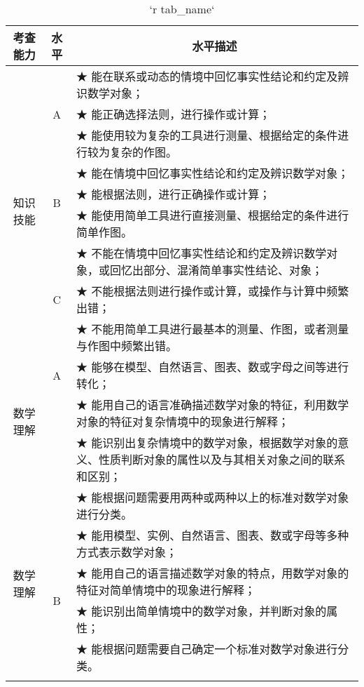 \begin{itshape}
\small
\begin{longtable}{|c|c|p{12cm}|}
\caption{`r tab_name`} \label{tab: `r tab_name`} \\
 
\hline
 \multicolumn{1}{|c}{\normalsize 考查能力} &  \multicolumn{1}{|c|}{\normalsize 水平} &  \multicolumn{1}{c|}{\normalsize 水平描述} \\ 
\hline
   
   \multirow{9}{*}{知识技能}  & \multirow{3}{*}{A}  & ★ 能在联系或动态的情境中回忆事实性结论和约定及辨识数学对象；  \\    
   & &  ★ 能正确选择法则，进行操作或计算； \\  
   & &  ★ 能使用较为复杂的工具进行测量、根据给定的条件进行较为复杂的作图。 \\    
\cline{2-3}      

   &   \multirow{3}{*}{B}  &  ★ 能在情境中回忆事实性结论和约定及辨识数学对象；\\  
   & &  ★ 能根据法则，进行正确操作或计算；\\  
   & &  ★ 能使用简单工具进行直接测量、根据给定的条件进行简单作图。 \\    
\cline{2-3}      

   &   \multirow{3}{*}{C}  &  ★ 不能在情境中回忆事实性结论和约定及辨识数学对象，或回忆出部分、混淆简单事实性结论、对象；\\  
   & &  ★ 不能根据法则进行操作或计算，或操作与计算中频繁出错；\\  
   & &  ★ 不能用简单工具进行最基本的测量、作图，或者测量与作图中频繁出错。 \\   
\hline
   
   \multirow{3}{*}{数学理解}  & \multirow{1}{*}{A}  & ★  能够在模型、自然语言、图表、数或字母之间等进行转化； \\    
   & &  ★ 能用自己的语言准确描述数学对象的特征，利用数学对象的特征对复杂情境中的现象进行解释； \\  
   & &  ★ 能识别出复杂情境中的数学对象，根据数学对象的意义、性质判断对象的属性以及与其相关对象之间的联系和区别；\\

   \hline    
   \multirow{9}{*}{数学理解}  &  &  ★ 能根据问题需要用两种或两种以上的标准对数学对象进行分类。\\    
\cline{2-3}      

   &   \multirow{4}{*}{B}  &  ★ 能用模型、实例、自然语言、图表、数或字母等多种方式表示数学对象；\\  
   & &  ★   能用自己的语言描述数学对象的特点，用数学对象的特征对简单情境中的现象进行解释；\\  
   & &  ★ 能识别出简单情境中的数学对象，并判断对象的属性； \\    
   & &  ★ 能根据问题需要自己确定一个标准对数学对象进行分类。 \\    
\cline{2-3}      


\end{longtable}
\end{itshape}
